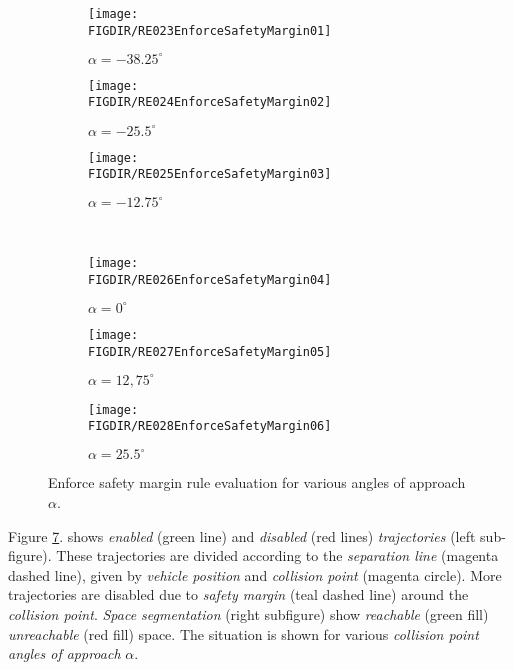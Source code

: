 \begin{figure}[H]
	\centering
    \begin{subfigure}{0.32\textwidth}
    	\centering
        \texttt{[image: \\FIGDIR/RE023EnforceSafetyMargin01]} 
        \vfill
        \caption{$\alpha=-38.25^\circ$}
        \label{fig:ruleEnforceSafetyMargin01}
    \end{subfigure}
    \begin{subfigure}{0.32\textwidth}
    	\centering
        \texttt{[image: \\FIGDIR/RE024EnforceSafetyMargin02]} 
        \vfill
        \caption{$\alpha=-25.5^\circ$}
        \label{fig:ruleEnforceSafetyMargin02}
    \end{subfigure}
    \begin{subfigure}{0.32\textwidth}
    	\centering
        \texttt{[image: \\FIGDIR/RE025EnforceSafetyMargin03]} 
        \vfill
        \caption{$\alpha=-12.75^\circ$}
        \label{fig:ruleEnforceSafetyMargin03}
    \end{subfigure}
    \\
    \begin{subfigure}{0.32\textwidth}
    	\centering
        \texttt{[image: \\FIGDIR/RE026EnforceSafetyMargin04]} 
        \vfill
        \caption{$\alpha=0^\circ$}
        \label{fig:ruleEnforceSafetyMargin04}
    \end{subfigure}
    \begin{subfigure}{0.32\textwidth}
    	\centering
        \texttt{[image: \\FIGDIR/RE027EnforceSafetyMargin05]} 
        \vfill
        \caption{$\alpha=12,75^\circ$}
        \label{fig:ruleEnforceSafetyMargin05}
    \end{subfigure}
    \begin{subfigure}{0.32\textwidth}
    	\centering
        \texttt{[image: \\FIGDIR/RE028EnforceSafetyMargin06]} 
        \vfill
        \caption{$\alpha=25.5^\circ$}
        \label{fig:ruleEnforceSafetyMargin06}
    \end{subfigure}
    \caption{Enforce safety margin rule evaluation for various angles of approach $\alpha$.}        
    \label{fig:ruleEnforceSafetyMarginGeneral}
\end{figure}

\noindent Figure \ref{fig:ruleEnforceSafetyMarginGeneral}. shows \emph{enabled} (green line) and \emph{disabled} (red lines) \emph{trajectories} (left sub-figure). These trajectories are divided according to the \emph{separation line} (magenta dashed line), given by \emph{vehicle position} and \emph{collision point} (magenta circle). More trajectories are disabled due to \emph{safety  margin} (teal dashed line) around the  \emph{collision point}. \emph{Space segmentation} (right subfigure) show \emph{reachable} (green fill) \emph{unreachable} (red fill) space. The situation is shown for various \emph{collision point angles of approach} $\alpha$.

